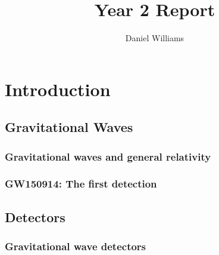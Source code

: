 \documentclass{kentigern}
\title{Year 2 Report}
\author{Daniel Williams}
\theoremstyle{definition}
\begin{document}

\begin{titlepage}
\thispagestyle{empty}

\maketitle
\newpage
\end{titlepage}


\tableofcontents

\dominitoc
\newpage
%

\part{Introduction}
\label{part:intro}


 \chapter{Gravitational Waves}
 \label{cha:grav-waves}
 
 \chapterprecis{}
 \minitoc

 \section{Gravitational waves and general relativity}
 \label{sec:grav-waves-gener}
 

 \section{GW150914: The first detection}
 \label{sec:gw150914:-first-dete}
 


 \chapter{Detectors}
 \label{cha:detectors}

 \chapterprecis{}

 \section{Gravitational wave detectors}
 \label{sec:detectors}
\end{document}

